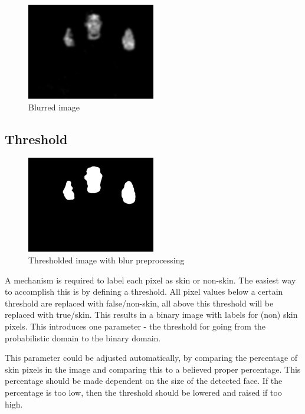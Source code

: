 \begin{figure}[htbp]
    \center{}
    \includegraphics[width=0.5\textwidth]{figures/pipeline/blurred.jpg}
	\caption{Blurred image}
	\label{fig:blurred}
\end{figure}


\subsection*{Threshold}

\begin{figure}[htbp]
    \center{}
    \includegraphics[width=0.5\textwidth]{figures/pipeline/thresholded.jpg}
	\caption{Thresholded image with blur preprocessing}
	\label{fig:threshold}
\end{figure}

A mechanism is required to label each pixel as skin or non-skin. The easiest way to accomplish this is by defining a threshold. All pixel values below a certain threshold are replaced with false/non-skin, all above this threshold will be replaced with true/skin. This results in a binary image with labels for (non) skin pixels. This introduces one parameter - the threshold for going from the probabilistic domain to the binary domain.

This parameter could be adjusted automatically, by comparing the percentage of skin pixels in the image and comparing this to a believed proper percentage. This percentage should be made dependent on the size of the detected face. If the percentage is too low, then the threshold should be lowered and raised if too high. 

